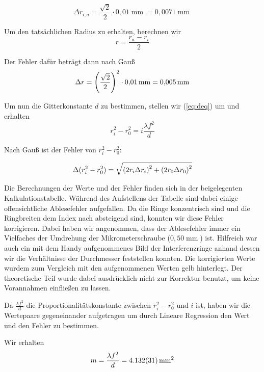 \documentclass[a4paper,german,12pt,smallheadings]{scrartcl}
\begin{document}
\begin{equation}
  \Delta r_{i,a} = \frac{\sqrt{2}}{2} \cdot 0{,}01 \operatorname{mm} = 0{,}0071
  \operatorname{mm}
\end{equation}

Um den tatsächlichen Radius zu erhalten, berechnen wir
\begin{equation}
  r = \frac{r_a - r_i}{2}
\end{equation}

Der Fehler dafür beträgt dann nach Gauß
\begin{equation}
  \Delta r = \del{\frac{\sqrt{2}}{2}}^2 \cdot 0{,}01 \operatorname{mm} = 0{,}005 \operatorname{mm}
\end{equation}

Um nun die Gitterkonstante $d$ zu bestimmen, stellen wir (\ref{eq:deq}) um und erhalten
\begin{equation}
  r_i^2 - r_0^2 = i \frac{\lambda f^2}{d}
\end{equation}

Nach Gauß ist der Fehler von $r_i^2 - r_0^2$:

\begin{align*}
  \Delta(r_i^2 - r_0^2) = \sqrt{\del{2 r_i \Delta r_i}^2 + \del{2 r_0 \Delta r_0}^2}
\end{align*}

Die Berechnungen der Werte und der Fehler finden sich in der beigelegenten
Kalkulationstabelle. Während des Aufstellens der Tabelle sind dabei einige
offensichtliche Ablesefehler aufgefallen. Da die Ringe konzentrisch sind und
die Ringbreiten dem Index nach absteigend sind, konnten wir diese Fehler
korrigieren. Dabei haben wir angenommen, dass der Ablesefehler immer ein
Vielfaches der Umdrehung der Mikrometerschraube ($0{,}50 \operatorname{mm}$)
ist. Hilfreich war auch ein mit dem Handy aufgenommenes Bild der
Interferenzringe anhand dessen wir die Verhältnisse der Durchmesser feststellen
konnten. Die korrigierten Werte wurdem zum Vergleich mit den aufgenommenen
Werten gelb hinterlegt. Der theoretische Teil wurde dabei ausdrücklich nicht
zur Korrektur benutzt, um keine Vorannahmen einfließen zu lassen.

Da $\frac{\lambda f^2}{d}$ die Proportionalitätskonstante zwischen
$r_i^2 - r_0^2$ und $i$ ist, haben wir die Wertepaare gegeneinander aufgetragen
um durch Lineare Regression den Wert und den Fehler zu bestimmen.

Wir erhalten
\begin{equation}
  m = \frac{\lambda f^2}{d} = \num{4.132\pm0.031} \operatorname{mm}^2
\end{equation}
\end{document}
